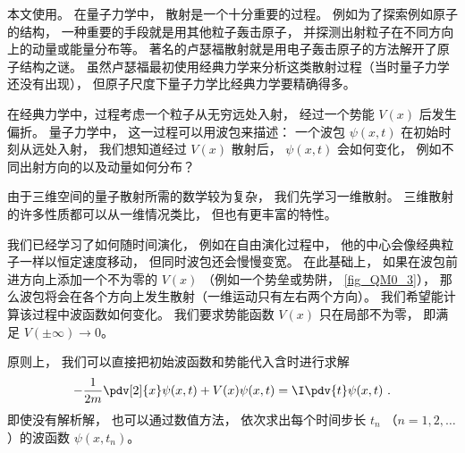 
\begin{issues}
\issueTODO
\end{issues}


本文使用。 在量子力学中， 散射是一个十分重要的过程。 例如为了探索例如原子的结构， 一种重要的手段就是用其他粒子轰击原子， 并探测出射粒子在不同方向上的动量或能量分布等。 著名的卢瑟福散射就是用电子轰击原子的方法解开了原子结构之谜。 虽然卢瑟福最初使用经典力学来分析这类散射过程（当时量子力学还没有出现）， 但原子尺度下量子力学比经典力学要精确得多。

在经典力学中，过程考虑一个粒子从无穷远处入射， 经过一个势能 $V(x)$ 后发生偏折。 量子力学中， 这一过程可以用波包来描述： 一个波包 $\psi(x, t)$ 在初始时刻从远处入射， 我们想知道经过 $V(x)$ 散射后， $\psi(x, t)$ 会如何变化， 例如不同出射方向的以及动量如何分布？

由于三维空间的量子散射所需的数学较为复杂， 我们先学习一维散射。 三维散射的许多性质都可以从一维情况类比， 但也有更丰富的特性。

我们已经学习了如何随时间演化， 例如在自由演化过程中， 他的中心会像经典粒子一样以恒定速度移动， 但同时波包还会慢慢变宽。 在此基础上， 如果在波包前进方向上添加一个不为零的 $V(x)$ （例如一个势垒或势阱， \autoref{fig_QM0_3}）， 那么波包将会在各个方向上发生散射（一维运动只有左右两个方向）。 我们希望能计算该过程中波函数如何变化。 我们要求势能函数 $V(x)$ 只在局部不为零， 即满足 $V(\pm\infty) \to 0$。 

原则上， 我们可以直接把初始波函数和势能代入含时进行求解
\begin{equation}\label{eq_Sca1D_1}
-\frac{1}{2m}\pdv[2]{x}\psi(x, t) + V(x) \psi(x, t) = \I \pdv{t} \psi(x, t)~.
\end{equation}
即使没有解析解， 也可以通过数值方法， 依次求出每个时间步长 $t_n$ （$n = 1, 2, \dots$）的波函数 $\psi(x, t_n)$。

